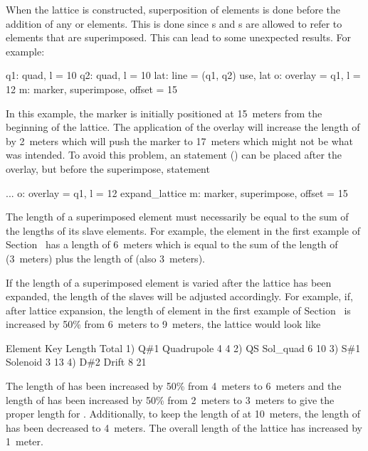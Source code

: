 When the lattice is constructed, superposition of elements is done
before the addition of any  or  elements. This
is done since s and s are allowed to refer
to elements that are superimposed. This can lead to some unexpected
results. For example:
\begin{example}
  q1: quad, l = 10
  q2: quad, l = 10
  lat: line = (q1, q2)
  use, lat
  o: overlay = {q1}, l = 12
  m: marker, superimpose, offset = 15
\end{example} 
In this example, the marker is initially positioned at 15~meters from
the beginning of the lattice.  The application of the overlay will
increase the length of  by 2~meters which will push the marker
 to 17~meters which might not be what was intended. To avoid
this problem, an  statement () can
be placed after the overlay, but before the superimpose, statement
\begin{example}
  ...
  o: overlay = {q1}, l = 12
  expand_lattice
  m: marker, superimpose, offset = 15
\end{example} 

The length of a superimposed element must necessarily be equal to the
sum of the lengths of its slave elements. For example, the element
 in the first example of Section~ has a length of
6~meters which is equal to the sum of the length of 
(3~meters) plus the length of  (also 3~meters).

If the length of a superimposed element is varied after the lattice
has been expanded, the length of the slaves will be adjusted
accordingly. For example, if, after lattice expansion, the length of
element  in the first example of Section~ is
increased by 50\% from 6~meters to 9~meters, the lattice would look
like
\begin{example}
        Element   Key         Length  Total
  1)    Q{\#}1       Quadrupole   4        4
  2)    Q{\B}S       Sol_quad     6       10
  3)    S{\#}1       Solenoid     3       13
  4)    D{\#}2       Drift        8       21
\end{example}
The length of  has been increased by 50\% from 4~meters to
6~meters and the length of  has been increased by 50\% from
2~meters to 3~meters to give the proper length for .
Additionally, to keep the length of  at 10~meters, the
length of  has been decreased to 4~meters. The overall
length of the lattice has increased by 1~meter.

